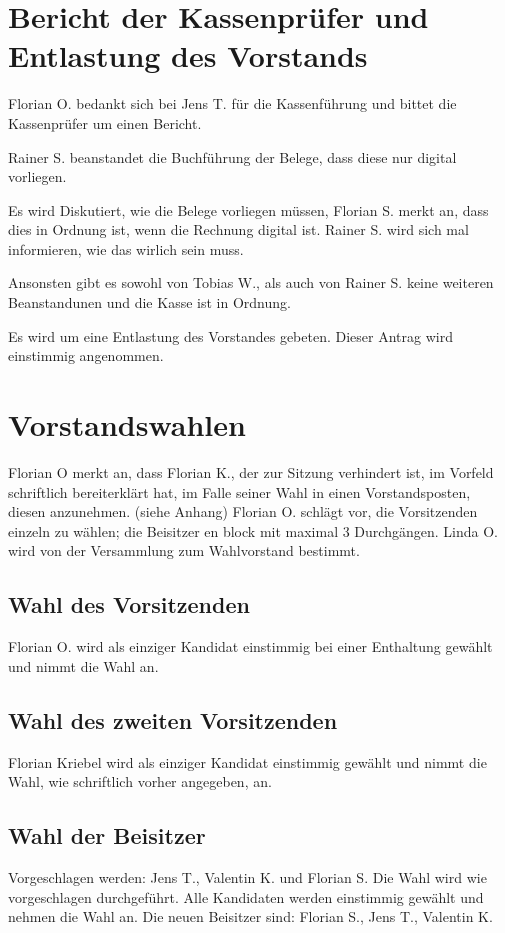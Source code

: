 \section{Bericht der Kassenprüfer und Entlastung des Vorstands}
Florian O. bedankt sich bei Jens T. für die Kassenführung und bittet die Kassenprüfer um einen Bericht.

Rainer S. beanstandet die Buchführung der Belege, dass diese nur digital vorliegen.

Es wird Diskutiert, wie die Belege vorliegen müssen, Florian S. merkt an, dass dies in Ordnung ist, wenn die Rechnung digital ist. Rainer S. wird sich mal informieren, wie das wirlich sein muss.

Ansonsten gibt es sowohl von Tobias W., als auch von Rainer S. keine weiteren Beanstandunen und die Kasse ist in Ordnung.

Es wird um eine Entlastung des Vorstandes gebeten.
Dieser Antrag wird einstimmig angenommen.



\section{Vorstandswahlen}
 Florian O merkt an, dass Florian K., der zur Sitzung verhindert ist, im Vorfeld schriftlich bereiterklärt hat, im Falle seiner Wahl in einen Vorstandsposten, diesen anzunehmen. (siehe Anhang)
 Florian O. schlägt vor, die Vorsitzenden einzeln zu wählen; die Beisitzer en block mit maximal 3 Durchgängen.
 Linda O. wird von der Versammlung zum Wahlvorstand bestimmt.
\subsection{Wahl des Vorsitzenden}
 Florian O. wird als einziger Kandidat einstimmig bei einer Enthaltung gewählt und nimmt die Wahl an. 
\subsection{Wahl des zweiten Vorsitzenden}         
 Florian Kriebel wird als einziger Kandidat einstimmig gewählt und nimmt die Wahl, wie schriftlich vorher angegeben, an. 
\subsection{Wahl der Beisitzer}
  Vorgeschlagen werden: Jens T., Valentin K. und Florian S.
  Die Wahl wird wie vorgeschlagen durchgeführt. 
  Alle Kandidaten werden einstimmig gewählt und nehmen die Wahl an. 
  Die neuen Beisitzer sind: Florian S., Jens T., Valentin K.

